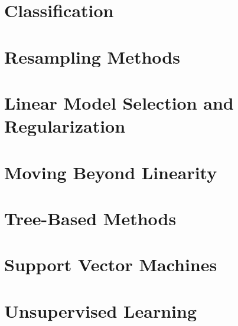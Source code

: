 \documentclass[12pt,a4paper]{article}
\begin{document}
\section{Classification}
\section{Resampling Methods}
\section{Linear Model Selection and Regularization}
\section{Moving Beyond Linearity}
\section{Tree-Based Methods}
\section{Support Vector Machines}
\section{Unsupervised Learning}
\end{document}
